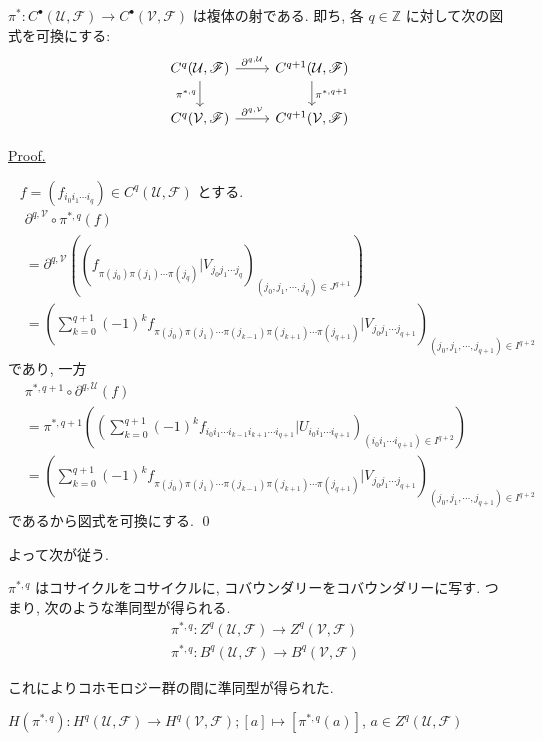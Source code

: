 \documentclass[a4paper,10pt,dvipdfmx]{jsreport}
\newenvironment{defi*}{\refstepcounter{theorem}\begin{itembox}[l]{\underline{Definition \arabic{chapter}.\arabic{section}.\arabic{theorem}.}}\vspace{-0.5zh}\ }{\end{itembox}}
\newenvironment{prop*}{\refstepcounter{theorem}\begin{itembox}[l]{\underline{Proposition \arabic{chapter}.\arabic{section}.\arabic{theorem}. }}\vspace{-0.5zh}\ }{\end{itembox}}
\renewenvironment{proof}{\begin{flushleft} \underline{Proof.} \end{flushleft}\vspace{-1zh}\ }{\qed\\}
\newcounter{theorem}[section]
\theoremstyle{definition}
\begin{document}
\begin{prop*}
    \(\pi^\ast \colon C^\bullet(\mathcal{U}, \mathscr{F}) \to C^\bullet(\mathcal{V}, \mathscr{F})\) は複体の射である. 即ち, 各 \(q\in \mathbb{Z}\) に対して次の図式を可換にする:
    \[\begin{tikzcd}
        {C^q(\mathcal{U}, \mathscr{F})} & {C^{q+1}(\mathcal{U}, \mathscr{F})} \\
        {C^{q}(\mathcal{V}, \mathscr{F})} & {C^{q+1}(\mathcal{V}, \mathscr{F})}
        \arrow["{\partial^{q,\mathcal{V}}}", from=2-1, to=2-2]
        \arrow["{\partial^{q,\mathcal{U}}}", from=1-1, to=1-2]
        \arrow["{\pi^{\ast, q+1}}", from=1-2, to=2-2]
        \arrow["{\pi^{\ast, q}}"', from=1-1, to=2-1]
    \end{tikzcd}\]
\end{prop*}
\begin{proof}
    \(f = (f_{i_0 i_1 \cdots i_{q}}) \in C^q(\mathcal{U}, \mathscr{F})\) とする.
    \begin{align*}
        &\partial^{q,\mathcal{V}} \circ \pi^{\ast,q}(f)\\
        &=\partial^{q,\mathcal{V}} \left( \left( f_{\pi(j_0)\pi(j_1)\cdots \pi(j_q)}|V_{j_0j_1\cdots j_q} \right)_{(j_0, j_1, \cdots, j_{q}) \in J^{q+1}} \right)\\
        &= \left( \sum_{k=0}^{q+1} (-1)^k f_{\pi(j_0)\pi(j_1)\cdots \pi(j_{k-1}) \pi(j_{k+1}) \cdots  \pi(j_{q+1})}|V_{j_0j_1\cdots j_{q+1}} \right)_{(j_0,j_1,\cdots ,j_{q+1}) \in I^{q+2}}
    \end{align*}
    であり, 一方
    \begin{align*}
        &\pi^{\ast,q+1}\circ\partial^{q, \mathcal{U}}(f)\\
        &= \pi^{\ast,q+1}\left( \left( \sum_{k=0}^{q+1} (-1)^k f_{i_0 i_1 \cdots i_{k-1} i_{k+1} \cdots i_{q+1}} | U_{i_0 i_1 \cdots i_{q+1}} \right)_{(i_0 i_1 \cdots i_{q+1}) \in I^{q+2}} \right)\\
        &= \left( \sum_{k=0}^{q+1} (-1)^k f_{\pi(j_0)\pi(j_1)\cdots \pi(j_{k-1}) \pi(j_{k+1}) \cdots  \pi(j_{q+1})}|V_{j_0j_1\cdots j_{q+1}} \right)_{(j_0,j_1,\cdots ,j_{q+1}) \in I^{q+2}}
    \end{align*}
    であるから図式を可換にする.
\end{proof}

よって次が従う.
\begin{prop*}
    \(\pi^{\ast,q}\) はコサイクルをコサイクルに, コバウンダリーをコバウンダリーに写す. つまり, 次のような準同型が得られる.
    \begin{align*}
        &\pi^{\ast,q}\colon Z^q(\mathcal{U},\mathscr{F}) \to Z^q (\mathcal{V},\mathscr{F})\\
        &\pi^{\ast,q}\colon B^q(\mathcal{U},\mathscr{F}) \to B^q (\mathcal{V},\mathscr{F})
    \end{align*}
\end{prop*}
これによりコホモロジー群の間に準同型が得られた.
\begin{defi*}
    \(H(\pi^{\ast,q}) \colon H^q(\mathcal{U},\mathscr{F}) \to H^q(\mathcal{V},\mathscr{F});[a] \mapsto [\pi^{\ast,q}(a)]\), \(a\in Z^q(\mathcal{U},\mathscr{F})\)
\end{defi*}
\end{document}
